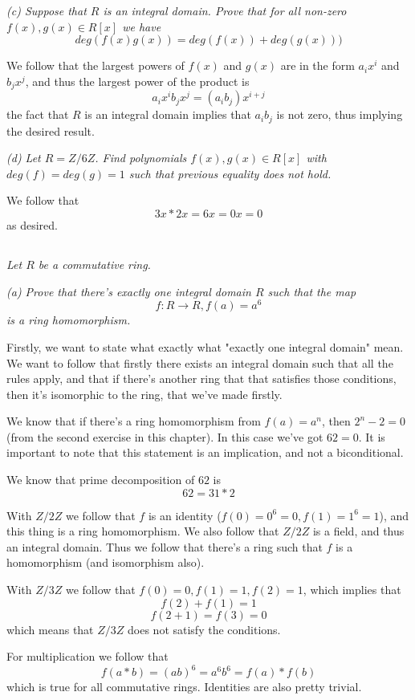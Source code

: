 \documentclass[11pt,oneside,titlepage]{book}
\begin{document}
\textit{(c) Suppose that $R$ is an integral domain. Prove that for all
non-zero $f(x), g(x) \in R[x]$ we have
  $$deg(f(x) g(x)) = deg(f(x)) + deg(g(x)))$$}

We follow that the largest powers of $f(x)$ and $g(x)$ are in the form
$a_i x^i$ and $b_j x^j$, and thus the largest power of the product is
$$a_i x^i b_j x^j = (a_i b_j)x^{i + j}$$
the fact that $R$ is an integral domain implies that $a_i b_j$ is not
zero, thus implying the desired result.

\textit{(d) Let $R = Z/6Z$. Find polynomials $f(x), g(x) \in R[x]$
with $deg(f) = deg(g) = 1$ such that previous equality does not hold.}

We follow that
$$3x * 2x = 6x = 0x = 0$$
as desired.

\subsection{}

\textit{Let $R$ be a commutative ring.}

\textit{(a) Prove that there's exactly one integral domain $R$ such
that the map
$$f: R \to R, f(a) = a^6$$
is a ring homomorphism.}

Firstly, we want to state what exactly what "exactly one integral
domain" mean. We want to follow that firstly there exists an integral
domain such that all the rules apply, and that if there's another ring
that that satisfies those conditions, then it's isomorphic to the
ring, that we've made firstly.

We know that if there's a ring homomorphism from $f(a) = a^n$, then
$2^n - 2 = 0$ (from the second exercise in this chapter). In this case
we've got $62 = 0$. It is important to note that this statement is an
implication, and not a biconditional.

We know that prime decomposition of $62$ is
$$62 = 31 * 2$$

With $Z/2Z$ we follow that $f$ is an identity ($f(0) = 0^6 = 0, f(1) =
1^6 = 1$), and this thing is a ring homomorphism. We also follow that
$Z/2Z$ is a field, and thus an integral domain. Thus we follow that
there's a ring such that $f$ is a homomorphism (and isomorphism also).

With $Z/3Z$ we follow that $f(0) = 0, f(1) = 1, f(2) = 1$, which
implies that
$$f(2) + f(1) = 1$$
$$f(2 + 1) = f(3) = 0$$
which means that $Z/3Z$ does not satisfy the conditions.

For multiplication we follow that
$$f(a * b) = (ab)^6 = a^6 b^6 = f(a) * f(b)$$
which is true for all commutative rings. Identities are also pretty
trivial.
\end{document}
